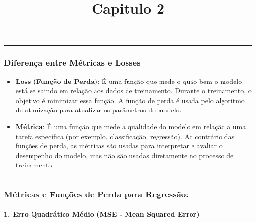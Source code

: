 \documentclass[11pt]{article}
\title{Capitulo 2}
\begin{document}
    
    \maketitle
    
    

    
    \begin{center}\rule{0.5\linewidth}{0.5pt}\end{center}

\hypertarget{diferenuxe7a-entre-muxe9tricas-e-losses}{%
\subsubsection{Diferença entre Métricas e
Losses}\label{diferenuxe7a-entre-muxe9tricas-e-losses}}

\begin{itemize}
\item
  \textbf{Loss (Função de Perda)}: É uma função que mede o quão bem o
  modelo está se saindo em relação aos dados de treinamento. Durante o
  treinamento, o objetivo é minimizar essa função. A função de perda é
  usada pelo algoritmo de otimização para atualizar os parâmetros do
  modelo.
\item
  \textbf{Métrica}: É uma função que mede a qualidade do modelo em
  relação a uma tarefa específica (por exemplo, classificação,
  regressão). Ao contrário das funções de perda, as métricas são usadas
  para interpretar e avaliar o desempenho do modelo, mas não são usadas
  diretamente no processo de treinamento.
\end{itemize}

\begin{center}\rule{0.5\linewidth}{0.5pt}\end{center}

\hypertarget{muxe9tricas-e-funuxe7uxf5es-de-perda-para-regressuxe3o}{%
\subsubsection{Métricas e Funções de Perda para
Regressão:}\label{muxe9tricas-e-funuxe7uxf5es-de-perda-para-regressuxe3o}}

\hypertarget{erro-quadruxe1tico-muxe9dio-mse---mean-squared-error}{%
\paragraph{1. Erro Quadrático Médio (MSE - Mean Squared
Error)}\label{erro-quadruxe1tico-muxe9dio-mse---mean-squared-error}}
\end{document}
